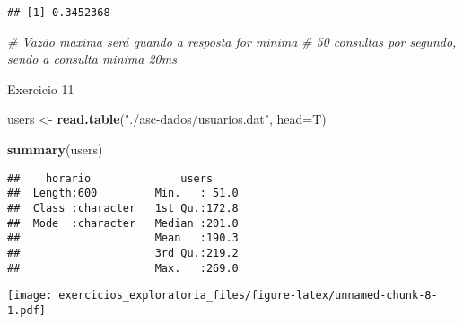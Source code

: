 \documentclass[
]{article}
\newenvironment{Shaded}{\begin{snugshade}}{\end{snugshade}}
\newcommand{\AttributeTok}[1]{\textcolor[rgb]{0.13,0.29,0.53}{#1}}
\newcommand{\CommentTok}[1]{\textcolor[rgb]{0.56,0.35,0.01}{\textit{#1}}}
\newcommand{\ControlFlowTok}[1]{\textcolor[rgb]{0.13,0.29,0.53}{\textbf{#1}}}
\newcommand{\FunctionTok}[1]{\textcolor[rgb]{0.13,0.29,0.53}{\textbf{#1}}}
\newcommand{\NormalTok}[1]{#1}
\newcommand{\OtherTok}[1]{\textcolor[rgb]{0.56,0.35,0.01}{#1}}
\newcommand{\SpecialCharTok}[1]{\textcolor[rgb]{0.81,0.36,0.00}{\textbf{#1}}}
\newcommand{\StringTok}[1]{\textcolor[rgb]{0.31,0.60,0.02}{#1}}
\begin{document}
\begin{Shaded}
\end{Shaded}

\begin{verbatim}
## [1] 0.3452368
\end{verbatim}

\begin{Shaded}
\begin{Highlighting}[]
\CommentTok{\# Vazão maxima será quando a resposta for minima}
\CommentTok{\# 50 consultas por segundo, sendo a consulta minima 20ms}
\end{Highlighting}
\end{Shaded}

Exercicio 11

\begin{Shaded}
\begin{Highlighting}[]
\NormalTok{users }\OtherTok{\textless{}{-}} \FunctionTok{read.table}\NormalTok{(}\StringTok{"./asc{-}dados/usuarios.dat"}\NormalTok{, }\AttributeTok{head=}\NormalTok{T)}

\FunctionTok{summary}\NormalTok{(users)}
\end{Highlighting}
\end{Shaded}

\begin{verbatim}
##    horario              users      
##  Length:600         Min.   : 51.0  
##  Class :character   1st Qu.:172.8  
##  Mode  :character   Median :201.0  
##                     Mean   :190.3  
##                     3rd Qu.:219.2  
##                     Max.   :269.0
\end{verbatim}

\begin{Shaded}
\end{Shaded}

\texttt{[image: exercicios\_exploratoria\_files/figure-latex/unnamed-chunk-8-1.pdf]}
\end{document}
